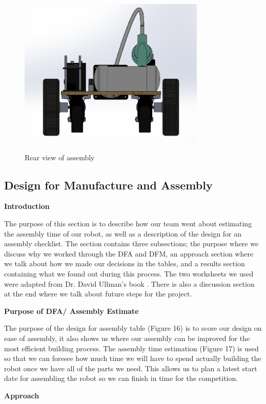 \documentclass[12pt,letterpaper,titlepage]{article}
\begin{document}
\begin{figure}[H]
	\centering
	\includegraphics[width=3.5in]{images/layout4}
	\label{fig:layout4}
	\caption{Rear view of assembly}
\end{figure}


\subsection{Design for Manufacture and Assembly}

\smallskip\noindent\textbf{Introduction}

The purpose of this section is to describe how our team went about estimating the assembly time of our robot, as well as a description of the design for an assembly checklist. The section contains three subsections; the purpose where we discuss why we worked through the DFA and DFM, an approach section where we talk about how we made our decisions in the tables, and a results section containing what we found out during this process. The two worksheets we used were adapted from Dr. David Ullman's book \cite{textbook}. There is also a discussion section at the end where we talk about future steps for the project.

\smallskip\noindent\textbf{Purpose of DFA/ Assembly Estimate}

The purpose of the design for assembly table (Figure 16) is to score our design on ease of assembly, it also shows us where our assembly can be improved for the most efficient building process. The assembly time estimation (Figure 17) is used so that we can foresee how much time we will have to spend actually building the robot once we have all of the parts we need. This allows us to plan a latest start date for assembling the robot so we can finish in time for the competition.

\smallskip\noindent\textbf{Approach}
\end{document}
